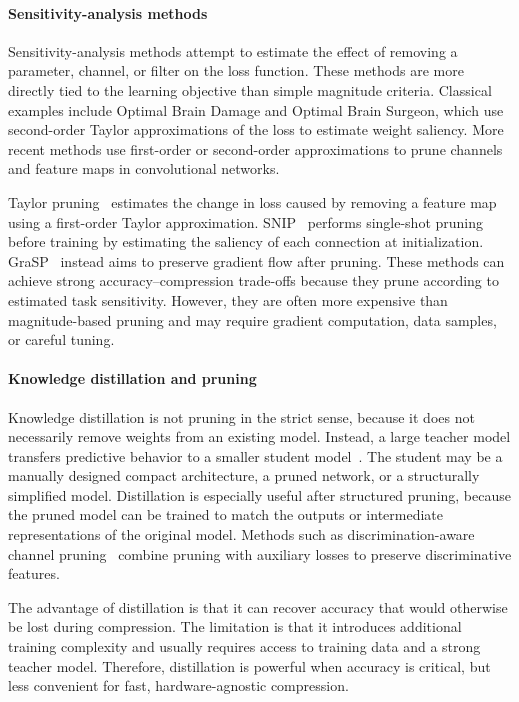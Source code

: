 \documentclass[12pt,a4paper]{report}
\begin{document}
\paragraph{Sensitivity-analysis methods}
Sensitivity-analysis methods attempt to estimate the effect of removing a parameter, channel, or
filter on the loss function. These methods are more directly tied to the learning objective than
simple magnitude criteria. Classical examples include Optimal Brain Damage and Optimal Brain
Surgeon, which use second-order Taylor approximations of the loss to estimate weight saliency.
More recent methods use first-order or second-order approximations to prune channels and feature
maps in convolutional networks.

Taylor pruning~\cite{molchanov2016pruning} estimates the change in loss caused by removing a
feature map using a first-order Taylor approximation. SNIP~\cite{lee2018snip} performs
single-shot pruning before training by estimating the saliency of each connection at initialization.
GraSP~\cite{wang2020picking} instead aims to preserve gradient flow after pruning. These methods
can achieve strong accuracy--compression trade-offs because they prune according to estimated
task sensitivity. However, they are often more expensive than magnitude-based pruning and may
require gradient computation, data samples, or careful tuning.

\paragraph{Knowledge distillation and pruning}
Knowledge distillation is not pruning in the strict sense, because it does not necessarily remove
weights from an existing model. Instead, a large teacher model transfers predictive behavior to a
smaller student model~\cite{hinton2015distilling}. The student may be a manually designed compact
architecture, a pruned network, or a structurally simplified model. Distillation is especially useful
after structured pruning, because the pruned model can be trained to match the outputs or
intermediate representations of the original model. Methods such as discrimination-aware channel
pruning~\cite{zhuang2018discrimination} combine pruning with auxiliary losses to preserve
discriminative features.

The advantage of distillation is that it can recover accuracy that would otherwise be lost during
compression. The limitation is that it introduces additional training complexity and usually
requires access to training data and a strong teacher model. Therefore, distillation is powerful when
accuracy is critical, but less convenient for fast, hardware-agnostic compression.
\end{document}
